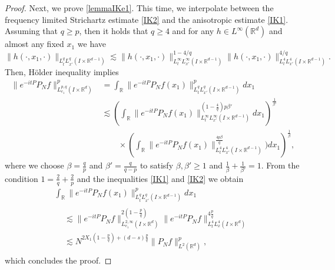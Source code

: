 \documentclass[10pt,leqno]{amsart}
\newcommand{\R}{\mathbb{R}}
\numberwithin{equation}{section}
\begin{document}
\begin{proof}
Next, we prove  \eqref{lemmaIKe1}. This time, we interpolate between the frequency limited Strichartz estimate \eqref{IK2} and the anisotropic estimate \eqref{IK1}. Assuming that $q \geq p$, then it holds that $q \geq 4$ and for any $h\in L^\infty (\R^d )$ and almost any fixed \(x_{1}\) we have
$$\|h (\cdot,x_{1},\cdot)\|_{L^q_{t}L^{q}_{x'} (I\times \R^{d-1})} \lesssim \|h(\cdot,x_{1},\cdot) \|_{L^\infty_{t}L^{\infty}_{x'} (I\times \R^{d-1} )}^{1-4/q} \|h(\cdot,x_{1},\cdot)\|_{L^4_{t}L^{4}_{x'} (I\times \R^{d-1} )}^{4/q}.$$
Then,  H\" older inequality implies
\begin{align*}
\big\|e^{-it P } P_N  f\big\|_{L^{p,q}_{e_{1}} (I\times\R^{d})}^{p}
&= \int_{\R} \big\|e^{-it P }  P_N f(x_{1}) \big\|_{L^q_{t}L^{q}_{x'} (I \times \R^{d-1})}^p dx_1
\\ 
&\lesssim \left(\int_\R \|e^{-it P }  P_N f(x_{1}) \|_{L^\infty_{t}L^{\infty}_{x'} (I\times \R^{d-1})}^{(1- \frac{4}{q})p \beta'} dx_{1} \right)^{\frac{1}{\beta'}}
\\ &\qquad \times \left(\int_{\R} \|e^{-it P }  P_N f(x_{1}) \|_{L^4_{t}L^{4}_{x'} (I\times \R^{d-1})}^{\frac{4p \beta}{q}}) dx_{1} \right)^{\frac{1}{\beta}},
\end{align*}
where we choose $\beta=\frac{q}{p}$ and $\beta' = \frac{q}{q-p}$ to satisfy \(\beta,\beta'\geq1\) and \(\frac{1}{\beta}+\frac{1}{\beta'}=1\). From the condition $1= \frac{2}{q} +\frac{2}{p}$ and the inequalities \eqref{IK1} and \eqref{IK2} we obtain
\begin{multline*}
\int_\R \|e^{-it P}  P_N f(x_{1}) \|_{L^q_{t}L^{q}_{x'} (I\times \R^{d-1})}^p dx_1 \\
\begin{aligned}
& \lesssim \|e^{-it P }  P_N f \|_{L^{2,\infty}_{e_{1}} (I\times \R^d )}^{2(1-\frac{p}{q})} \|e^{-it P }  P_N f \|_{L^4_{t}L^{4}_{x} (I\times \R^d)}^{4\frac{ p}{q}} \\
&\lesssim N^{2X_1 (1-\frac{p}{q}) +(d-s) \frac{p}{q} } \|P_N f\|_{L^2 (\R^d)}^p ,
\end{aligned}
\end{multline*}
which concludes the proof.
\end{proof}
\end{document}
